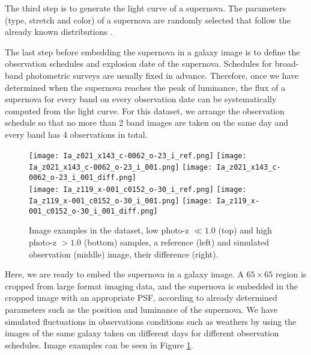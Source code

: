 \documentclass[conference,compsoc]{IEEEtran}
\begin{document}
  The third step is to generate the light curve of a supernova.
  The parameters (type, stretch and color) of a supernova are randomly selected that follow the already known distributions \cite{Mosher2014}. %

  The last step before embedding the supernova in a galaxy image is to define the observation schedules and explosion date of the supernova.
  Schedules for broad-band photometric surveys are usually fixed in advance.
  Therefore, once we have determined when the supernova reaches the peak of luminance, the flux of a supernova for every band on every observation date can be systematically computed from the light curve.
  For this dataset, we arrange the observation schedule so that no more than 2 band images are taken on the same day and every band has 4 observations in total.

\begin{figure}[t]
  \begin{center}
    \texttt{[image: Ia\_z021\_x143\_c-0062\_o-23\_i\_ref.png]}\hspace{10pt}
    \texttt{[image: Ia\_z021\_x143\_c-0062\_o-23\_i\_001.png]}\hspace{10pt}
    \texttt{[image: Ia\_z021\_x143\_c-0062\_o-23\_i\_001\_diff.png]}\\
    \vspace{5pt}
    \texttt{[image: Ia\_z119\_x-001\_c0152\_o-30\_i\_ref.png]}\hspace{10pt}
    \texttt{[image: Ia\_z119\_x-001\_c0152\_o-30\_i\_001.png]}\hspace{10pt}
    \texttt{[image: Ia\_z119\_x-001\_c0152\_o-30\_i\_001\_diff.png]}
  \end{center}
  \caption{%
    Image examples in the dataset, low photo-z $\ll 1.0$ (top) and high photo-z $>1.0$ (bottom) samples,
    a reference (left) and simulated observation (middle) image,  their difference (right).
  }
  \label{fig:data_examples}
\end{figure}

  Here, we are ready to embed the supernova in a galaxy image.
  A $65\times 65$ region is cropped from large format imaging data, and the supernova is embedded in the cropped image with an appropriate PSF, according to already determined parameters such as the position and luminance of the supernova.
  We have simulated fluctuations in observations conditions such as weathers by using the images of the same galaxy taken on different days for different observation schedules.
  Image examples can be seen in Figure \ref{fig:data_examples}.
\end{document}

